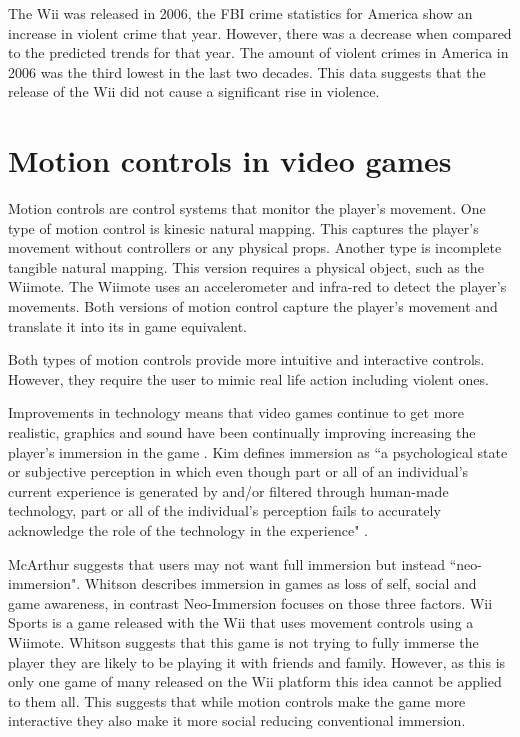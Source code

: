 \documentclass{scrartcl}
\begin{document}
The Wii was released in 2006, the FBI crime statistics for America show an increase in violent crime that year.  \cite{FBI}  However, there was a decrease when compared to the predicted trends for that year. The amount of violent crimes in America in 2006 was the third lowest in the last two decades. \cite{FBIArchives} This data suggests that the release of the Wii did not cause a significant rise in violence.


\section{Motion controls in video games}
Motion controls are control systems that monitor the player's movement. One type of motion control is kinesic natural mapping. This captures the player's movement without controllers or any physical props. Another type is incomplete tangible natural mapping. This version requires a physical object, such as the Wiimote. The Wiimote uses an accelerometer and infra-red to detect the player's movements. Both versions of motion control capture the player's movement and translate it into its in game equivalent.  \cite{McEwan2012}  

Both types of motion controls provide more intuitive and interactive controls. \cite{Kim}  However, they require the user to mimic real life action including violent ones. 

\bigskip
Improvements in technology means that video games continue to get more realistic, graphics and sound have been continually improving increasing the player's immersion in the game \cite{Kim}. Kim defines immersion as ``a psychological state or subjective perception in which even though part or all of an   individual’s   current   experience is generated by and/or filtered through human-made technology, part or all of the individual’s perception fails to accurately acknowledge the role of the technology in the experience" \cite{Kim}.

\bigskip
McArthur suggests that users may not want full immersion but instead ``neo-immersion". \cite{McArthur} Whitson describes immersion in games as loss of  self, social and game awareness, in contrast Neo-Immersion focuses on those three factors. \cite{Whitson} Wii Sports is a game released with the Wii that uses movement controls using a Wiimote. Whitson suggests that this game is not trying to fully immerse the player they are likely to be playing it with friends and family. However, as this is only one game of many released on the Wii platform this idea cannot be applied to them all. This suggests that while motion controls make the game more interactive they also make it more social reducing conventional immersion.
\end{document}
